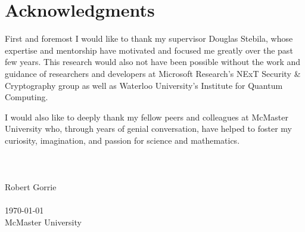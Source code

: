 \cleardoublepage
{}
{}
\chapter*{Acknowledgments}
\vspace{1.0in}
First and foremost I would like to thank my supervisor Douglas Stebila, whose expertise and mentorship have motivated and focused me greatly over the past few years. This research would also not have been possible without the work and guidance of researchers and developers at Microsoft Research's NExT Security \& Cryptography group as well as Waterloo University's Institute for Quantum Computing.

I would also like to deeply thank my fellow peers and colleagues at McMaster University who, through years of genial conversation, have helped to foster my curiosity, imagination, and passion for science and mathematics.
\\
\\
\\ 
\\
Robert Gorrie \\ 
\\
\today\\
{McMaster University}\\
\newpage
